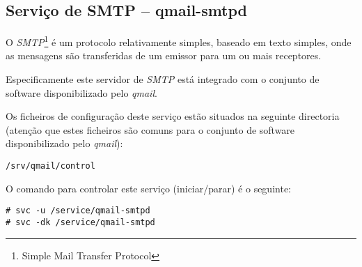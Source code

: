 \subsection{Serviço de SMTP -- qmail-smtpd}

O \emph{SMTP}\footnote{Simple Mail Transfer Protocol} é um protocolo relativamente
simples, baseado em texto simples, onde as mensagens são transferidas de um emissor
para um ou mais receptores.

Especificamente este servidor de \emph{SMTP} está integrado com o conjunto de software
disponibilizado pelo \emph{qmail}.

Os ficheiros de configuração deste serviço estão situados na seguinte directoria
(atenção que estes ficheiros são comuns para o conjunto de software disponibilizado pelo
\emph{qmail}):

\begin{Verbatim}[commandchars=\\\{\}]
/srv/qmail/control
\end{Verbatim}

O comando para controlar este serviço (iniciar/parar) é o seguinte:

\begin{Verbatim}[commandchars=\\\{\}]
# svc -u /service/qmail-smtpd
# svc -dk /service/qmail-smtpd
\end{Verbatim}

